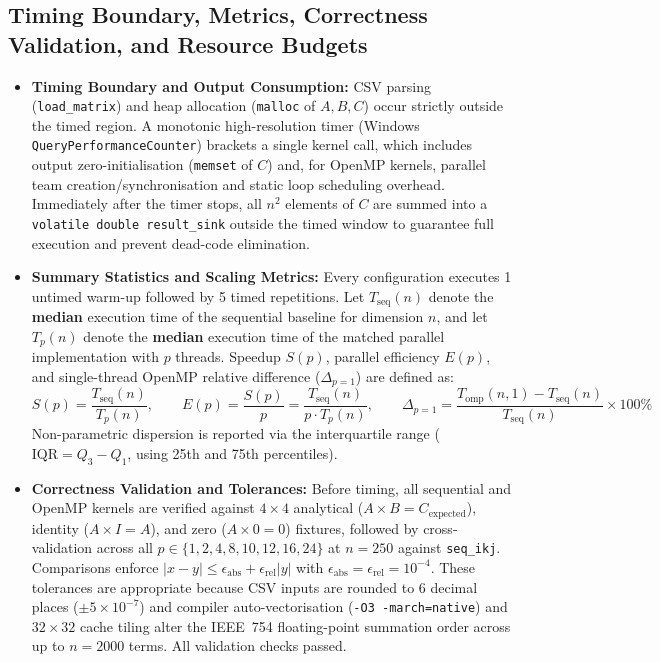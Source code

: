 \documentclass[11pt,a4paper]{article}
\begin{document}
\subsection{Timing Boundary, Metrics, Correctness Validation, and Resource Budgets}
\begin{itemize}
    \item \textbf{Timing Boundary and Output Consumption:} CSV parsing (\texttt{load\_matrix}) and heap allocation (\texttt{malloc} of $A, B, C$) occur strictly outside the timed region. A monotonic high-resolution timer (Windows \texttt{QueryPerformanceCounter}) brackets a single kernel call, which includes output zero-initialisation (\texttt{memset} of $C$) and, for OpenMP kernels, parallel team creation/synchronisation and static loop scheduling overhead. Immediately after the timer stops, all $n^2$ elements of $C$ are summed into a \texttt{volatile double result\_sink} outside the timed window to guarantee full execution and prevent dead-code elimination.
    \item \textbf{Summary Statistics and Scaling Metrics:} Every configuration executes 1 untimed warm-up followed by 5 timed repetitions. Let $T_{\text{seq}}(n)$ denote the \textbf{median} execution time of the sequential baseline for dimension $n$, and let $T_p(n)$ denote the \textbf{median} execution time of the matched parallel implementation with $p$ threads. Speedup $S(p)$, parallel efficiency $E(p)$, and single-thread OpenMP relative difference ($\Delta_{p=1}$) are defined as:
    \begin{equation}
        S(p) = \frac{T_{\text{seq}}(n)}{T_p(n)}, \qquad E(p) = \frac{S(p)}{p} = \frac{T_{\text{seq}}(n)}{p \cdot T_p(n)}, \qquad \Delta_{p=1} = \frac{T_{\text{omp}}(n,1) - T_{\text{seq}}(n)}{T_{\text{seq}}(n)} \times 100\%
    \end{equation}
    Non-parametric dispersion is reported via the interquartile range ($\text{IQR} = Q_3 - Q_1$, using 25th and 75th percentiles).
    \item \textbf{Correctness Validation and Tolerances:} Before timing, all sequential and OpenMP kernels are verified against $4 \times 4$ analytical ($A \times B = C_{\text{expected}}$), identity ($A \times I = A$), and zero ($A \times 0 = 0$) fixtures, followed by cross-validation across all $p \in \{1, 2, 4, 8, 10, 12, 16, 24\}$ at $n = 250$ against \texttt{seq\_ikj}. Comparisons enforce $|x - y| \le \epsilon_{\text{abs}} + \epsilon_{\text{rel}}|y|$ with $\epsilon_{\text{abs}} = \epsilon_{\text{rel}} = 10^{-4}$. These tolerances are appropriate because CSV inputs are rounded to 6 decimal places ($\pm 5 \times 10^{-7}$) and compiler auto-vectorisation (\texttt{-O3 -march=native}) and $32 \times 32$ cache tiling alter the IEEE~754 floating-point summation order across up to $n = 2000$ terms. All validation checks passed.

\end{itemize}
\end{document}
